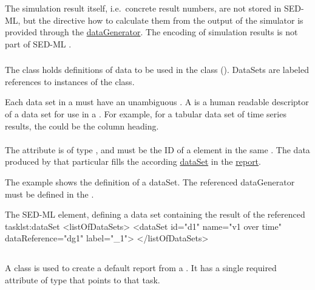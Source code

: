 The simulation result itself, i.e.\ concrete result numbers, are not stored in SED-ML, but the directive how to calculate them from the output of the simulator is provided through the \hyperref[class:dataGenerator]{dataGenerator}. The encoding of simulation results is not part of SED-ML \currentLV.

\begin{blockChanged}
\subsubsection{}
\label{class:dataSet}
The \DataSet class holds definitions of data to be used in the \Report class (). DataSets are labeled references to instances of the \DataGenerator class.

Each data set in a \Report must have an unambiguous . A  is a human readable descriptor of a data set for use in a \Report. For example, for a tabular data set of time series results, the  could be the column heading. 

\paragraph*{}
\label{sec:dataReference}
The  attribute is of type \SIdRef, and must be the ID of a \DataGenerator element in the same \SedDocument.  The data produced by that particular \DataGenerator fills the according \hyperref[class:dataSet]{dataSet} in the \hyperref[class:report]{report}.

The example shows the definition of a dataSet. The referenced dataGenerator  must be defined in the \hyperref[class:listOfDataGenerators]{}.
\begin{myXmlLst}{The SED-ML  element, defining a data set containing the result of the referenced task}{lst:dataSet}
<listOfDataSets>
	<dataSet id="d1" name="v1 over time" dataReference="dg1" label="_1">
</listOfDataSets>
\end{myXmlLst}

\subsection{}
\label{class:parameterEstimationReport}
A \ParameterEstimationReport class is used to create a default report from a \ParameterEstimationTask.  It has a single required attribute  of type \SIdRef that points to that task.


\end{blockChanged}
